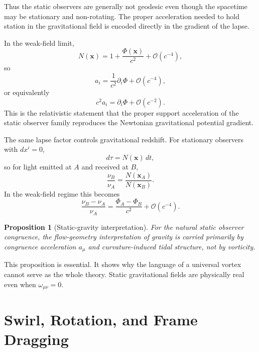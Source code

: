 \documentclass[11pt]{article}
\newtheorem{proposition}{Proposition}
\begin{document}
Thus the static observers are generally not geodesic even though the spacetime may be stationary and non-rotating. The proper acceleration needed to hold station in the gravitational field is encoded directly in the gradient of the lapse.

In the weak-field limit,
\begin{equation}
N(\mathbf{x})
=
1+\frac{\Phi(\mathbf{x})}{c^2}
+\mathcal{O}(c^{-4}),
\label{eq:lapseweakfield}
\end{equation}
so
\begin{equation}
a_i
=
\frac{1}{c^2}\partial_i \Phi
+\mathcal{O}(c^{-4}),
\label{eq:weakfieldacceleration}
\end{equation}
or equivalently
\begin{equation}
c^2 a_i
=
\partial_i \Phi
+\mathcal{O}(c^{-2}).
\label{eq:physicalacceleration}
\end{equation}
This is the relativistic statement that the proper support acceleration of the static observer family reproduces the Newtonian gravitational potential gradient.

The same lapse factor controls gravitational redshift. For stationary observers with \(dx^i=0\),
\begin{equation}
d\tau = N(\mathbf{x})\,dt,
\label{eq:stationarytime}
\end{equation}
so for light emitted at \(A\) and received at \(B\),
\begin{equation}
\frac{\nu_B}{\nu_A}
=
\frac{N(\mathbf{x}_A)}{N(\mathbf{x}_B)}.
\label{eq:redshift}
\end{equation}
In the weak-field regime this becomes
\begin{equation}
\frac{\nu_B-\nu_A}{\nu_A}
=
\frac{\Phi_A-\Phi_B}{c^2}
+\mathcal{O}(c^{-4}).
\label{eq:redshiftweakfield}
\end{equation}

\begin{proposition}[Static-gravity interpretation]
For the natural static observer congruence, the flow-geometry interpretation of gravity is carried primarily by congruence acceleration \(a_\mu\) and curvature-induced tidal structure, not by vorticity.
\end{proposition}

This proposition is essential. It shows why the language of a universal vortex cannot serve as the whole theory. Static gravitational fields are physically real even when \(\omega_{\mu\nu}=0\).

\section{Swirl, Rotation, and Frame Dragging}
\end{document}
